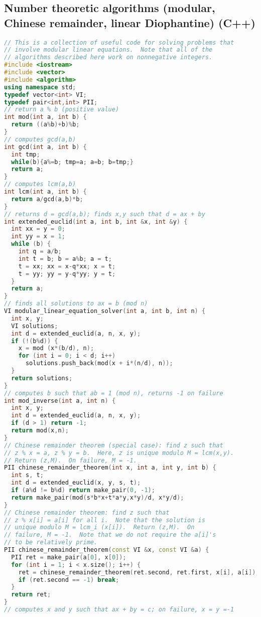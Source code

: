 \subsection{Number theoretic algorithms (modular, Chinese remainder, linear Diophantine) (C++)}
\begin{lstlisting}[language=C++]
// This is a collection of useful code for solving problems that
// involve modular linear equations.  Note that all of the
// algorithms described here work on nonnegative integers.
#include <iostream>
#include <vector>
#include <algorithm>
using namespace std;
typedef vector<int> VI;
typedef pair<int,int> PII;
// return a % b (positive value)
int mod(int a, int b) {
  return ((a%b)+b)%b;
}
// computes gcd(a,b)
int gcd(int a, int b) {
  int tmp;
  while(b){a%=b; tmp=a; a=b; b=tmp;}
  return a;
}
// computes lcm(a,b)
int lcm(int a, int b) {
  return a/gcd(a,b)*b;
}
// returns d = gcd(a,b); finds x,y such that d = ax + by
int extended_euclid(int a, int b, int &x, int &y) {  
  int xx = y = 0;
  int yy = x = 1;
  while (b) {
    int q = a/b;
    int t = b; b = a%b; a = t;
    t = xx; xx = x-q*xx; x = t;
    t = yy; yy = y-q*yy; y = t;
  }
  return a;
}
// finds all solutions to ax = b (mod n)
VI modular_linear_equation_solver(int a, int b, int n) {
  int x, y;
  VI solutions;
  int d = extended_euclid(a, n, x, y);
  if (!(b%d)) {
    x = mod (x*(b/d), n);
    for (int i = 0; i < d; i++)
      solutions.push_back(mod(x + i*(n/d), n));
  }
  return solutions;
}
// computes b such that ab = 1 (mod n), returns -1 on failure
int mod_inverse(int a, int n) {
  int x, y;
  int d = extended_euclid(a, n, x, y);
  if (d > 1) return -1;
  return mod(x,n);
}
// Chinese remainder theorem (special case): find z such that
// z % x = a, z % y = b.  Here, z is unique modulo M = lcm(x,y).
// Return (z,M).  On failure, M = -1.
PII chinese_remainder_theorem(int x, int a, int y, int b) {
  int s, t;
  int d = extended_euclid(x, y, s, t);
  if (a%d != b%d) return make_pair(0, -1);
  return make_pair(mod(s*b*x+t*a*y,x*y)/d, x*y/d);
}
// Chinese remainder theorem: find z such that
// z % x[i] = a[i] for all i.  Note that the solution is
// unique modulo M = lcm_i (x[i]).  Return (z,M).  On 
// failure, M = -1.  Note that we do not require the a[i]'s
// to be relatively prime.
PII chinese_remainder_theorem(const VI &x, const VI &a) {
  PII ret = make_pair(a[0], x[0]);
  for (int i = 1; i < x.size(); i++) {
    ret = chinese_remainder_theorem(ret.second, ret.first, x[i], a[i]);
    if (ret.second == -1) break;
  }
  return ret;
}
// computes x and y such that ax + by = c; on failure, x = y =-1

\end{lstlisting}

